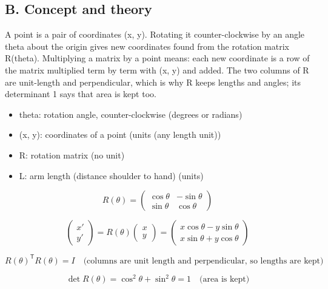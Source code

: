 \documentclass[11pt,a4paper]{article}
\begin{document}
\subsection*{B. Concept and theory}
A point is a pair of coordinates (x, y). Rotating it counter-clockwise by an angle theta about the origin gives new coordinates found from the rotation matrix R(theta). Multiplying a matrix by a point means: each new coordinate is a row of the matrix multiplied term by term with (x, y) and added. The two columns of R are unit-length and perpendicular, which is why R keeps lengths and angles; its determinant 1 says that area is kept too.

\begin{itemize}[nosep]
\item theta: rotation angle, counter-clockwise (degrees or radians)
\item (x, y): coordinates of a point (units (any length unit))
\item R: rotation matrix (no unit)
\item L: arm length (distance shoulder to hand) (units)
\end{itemize}

\begin{equation*}
R(\theta)=\begin{pmatrix}\cos\theta & -\sin\theta\\ \sin\theta & \cos\theta\end{pmatrix}
\end{equation*}

\begin{equation*}
\begin{pmatrix}x'\\ y'\end{pmatrix}=R(\theta)\begin{pmatrix}x\\ y\end{pmatrix}=\begin{pmatrix}x\cos\theta-y\sin\theta\\ x\sin\theta+y\cos\theta\end{pmatrix}
\end{equation*}

\begin{equation*}
R(\theta)^{\mathsf T}R(\theta)=I\quad\text{(columns are unit length and perpendicular, so lengths are kept)}
\end{equation*}

\begin{equation*}
\det R(\theta)=\cos^2\theta+\sin^2\theta=1\quad\text{(area is kept)}
\end{equation*}
\end{document}
